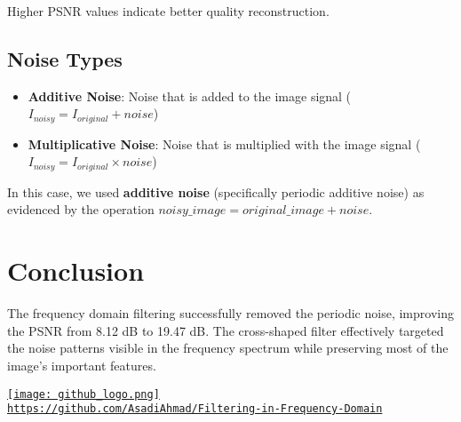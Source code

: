 \documentclass[12pt]{article}
\begin{document}
Higher PSNR values indicate better quality reconstruction.

\subsection{Noise Types}
\begin{itemize}
    \item \textbf{Additive Noise}: Noise that is added to the image signal ($I_{noisy} = I_{original} + noise$)
    \item \textbf{Multiplicative Noise}: Noise that is multiplied with the image signal ($I_{noisy} = I_{original} \times noise$)
\end{itemize}

In this case, we used \textbf{additive noise} (specifically periodic additive noise) as evidenced by the operation $noisy\_image = original\_image + noise$.

\section{Conclusion}
The frequency domain filtering successfully removed the periodic noise, improving the PSNR from 8.12 dB to 19.47 dB. The cross-shaped filter effectively targeted the noise patterns visible in the frequency spectrum while preserving most of the image's important features.

\begin{center}
    \href{https://github.com/AsadiAhmad/Filtering-in-Frequency-Domain}{
        \texttt{[image: github\_logo.png]} \\
        \texttt{https://github.com/AsadiAhmad/Filtering-in-Frequency-Domain}
    }
\end{center}
\end{document}
